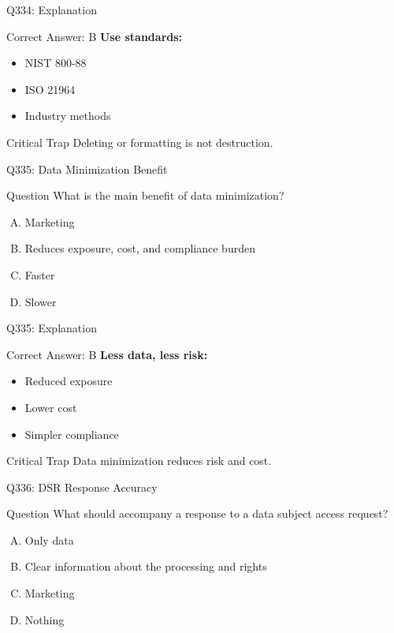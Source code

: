 \documentclass{beamer}
\begin{document}
	\begin{frame}{Q334: Explanation}
		\begin{block}{Correct Answer: B}
			\textbf{Use standards:}
			\begin{itemize}
				\item NIST 800-88
				\item ISO 21964
				\item Industry methods
			\end{itemize}
		\end{block}
		\begin{alertblock}{Critical Trap}
			Deleting or formatting is not destruction.
		\end{alertblock}
	\end{frame}
	
	\begin{frame}{Q335: Data Minimization Benefit}
		\begin{block}{Question}
			What is the main benefit of data minimization?
		\end{block}
		\begin{enumerate}[(A)]
			\item Marketing
			\item Reduces exposure, cost, and compliance burden
			\item Faster
			\item Slower
		\end{enumerate}
	\end{frame}
	
	\begin{frame}{Q335: Explanation}
		\begin{block}{Correct Answer: B}
			\textbf{Less data, less risk:}
			\begin{itemize}
				\item Reduced exposure
				\item Lower cost
				\item Simpler compliance
			\end{itemize}
		\end{block}
		\begin{alertblock}{Critical Trap}
			Data minimization reduces risk and cost.
		\end{alertblock}
	\end{frame}
	
	\begin{frame}{Q336: DSR Response Accuracy}
		\begin{block}{Question}
			What should accompany a response to a data subject access request?
		\end{block}
		\begin{enumerate}[(A)]
			\item Only data
			\item Clear information about the processing and rights
			\item Marketing
			\item Nothing
		\end{enumerate}
	\end{frame}
	
\end{document}
